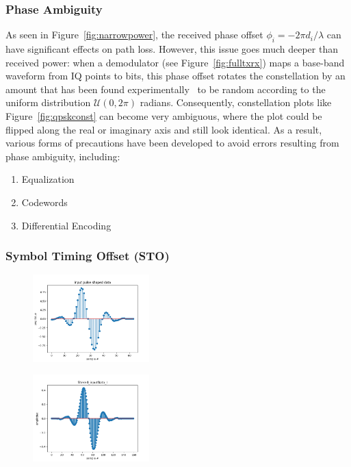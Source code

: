 \subsubsection{Phase Ambiguity}
\label{phaseam}
As seen in Figure~\ref{fig:narrowpower}, the received phase offset $\phi_i = -2\pi d_i / \lambda$ can have significant effects on path loss. However, this issue goes much deeper than received power: when a demodulator (see Figure~\ref{fig:fulltxrx}) maps a base-band waveform from IQ points to bits, this phase offset rotates the constellation by an amount that has been found experimentally~\cite{pahlavan2005wireless} to be random according to the uniform distribution $\mathcal{U}(0,2\pi)$ radians. Consequently, constellation plots like Figure~\ref{fig:qpskconst} can become very ambiguous, where the plot could be flipped along the real or imaginary axis and still look identical. As a result, various forms of precautions have been developed to avoid errors resulting from phase ambiguity, including:
\begin{enumerate}
\item Equalization
\item Codewords
\item Differential Encoding
\end{enumerate}
\subsubsection{Symbol Timing Offset (STO)}
\label{sto}

\FloatBarrier
\begin{figure}[ht!]
	\centering	\includegraphics[width=0.4\textwidth,keepaspectratio]{figs/email_ps.png}
    \caption{} 
\label{fig:stoin}      
\end{figure}
\FloatBarrier

\FloatBarrier
\begin{figure}[ht!]
	\centering	\includegraphics[width=0.4\textwidth,keepaspectratio]{figs/email_ifilt.png}
    \caption{} 
\label{fig:stoin}      
\end{figure}
\FloatBarrier

